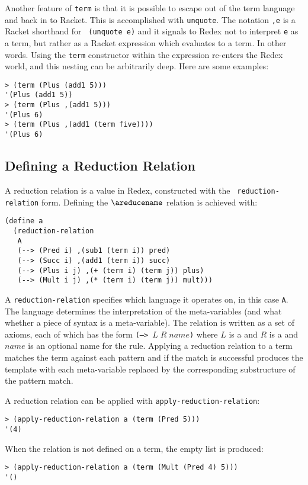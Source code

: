 Another feature of {\tt term} is that it is possible to escape out of
the term language and back in to Racket.  This is accomplished with
{\tt unquote}.  The notation {\tt ,e} is a Racket shorthand for {\tt
  (unquote e)} and it signals to Redex not to interpret {\tt e} as a
term, but rather as a Racket expression which evaluates to a term.  In
other words.  Using the {\tt term} constructor within the expression
re-enters the Redex world, and this nesting can be arbitrarily deep.
Here are some examples:
\begin{verbatim}
> (term (Plus (add1 5)))
'(Plus (add1 5))
> (term (Plus ,(add1 5)))
'(Plus 6)
> (term (Plus ,(add1 (term five))))
'(Plus 6)
\end{verbatim}


\subsection{Defining a Reduction Relation}

A reduction relation is a value in Redex, constructed with the {\tt
  reduction-relation} form.  Defining the $\areducename$ relation is
achieved with:
\begin{verbatim}
(define a
  (reduction-relation
   A
   (--> (Pred i) ,(sub1 (term i)) pred)
   (--> (Succ i) ,(add1 (term i)) succ)
   (--> (Plus i j) ,(+ (term i) (term j)) plus)
   (--> (Mult i j) ,(* (term i) (term j)) mult)))
\end{verbatim}
A {\tt reduction-relation} specifies which language it operates on, in
this case {\tt A}.  The language determines the interpretation of the
meta-variables (and what whether a piece of syntax is a
meta-variable).  The relation is written as a set of axioms, each of
which has the form {\tt (--> $L\;R\;\mathit{name}$)} where $L$ is a
 and $R$ is a  and $\mathit{name}$
is an optional name for the rule.  Applying a reduction relation to a
term matches the term against each pattern and if the match is
successful produces the template with each meta-variable replaced by
the corresponding substructure of the pattern match.

A reduction relation can be applied with {\tt apply-reduction-relation}:
\begin{verbatim}
> (apply-reduction-relation a (term (Pred 5)))
'(4)
\end{verbatim}
When the relation is not defined on a term, the empty list is produced:
\begin{verbatim}
> (apply-reduction-relation a (term (Mult (Pred 4) 5)))
'()
\end{verbatim}

